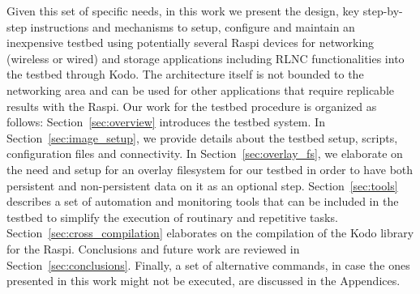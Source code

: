 Given this set of specific needs, in this work we present the design, key step-by-step instructions and mechanisms to setup, configure and maintain an inexpensive testbed using potentially several \ac{Raspi} devices for networking (wireless or wired) and storage applications including \ac{RLNC} functionalities into the testbed through Kodo. The architecture itself is not bounded to the networking area and can be used for other applications that require replicable results with the \ac{Raspi}. Our work for the testbed procedure is organized as follows: Section~\ref{sec:overview} introduces the testbed system. In Section~\ref{sec:image_setup}, we provide details about the testbed setup, scripts, configuration files and connectivity. In Section~\ref{sec:overlay_fs}, we elaborate on the need and setup for an overlay filesystem for our testbed in order to have both persistent and non-persistent data on it as an optional step. Section~\ref{sec:tools} describes a set of automation and monitoring tools that can be included in the testbed to simplify the execution of routinary and repetitive tasks. Section~\ref{sec:cross_compilation} elaborates on the compilation of the Kodo library for the \ac{Raspi}. Conclusions and future work are reviewed in Section~\ref{sec:conclusions}. Finally, a set of alternative commands, in case the ones presented in this work might not be executed, are discussed in the Appendices.

